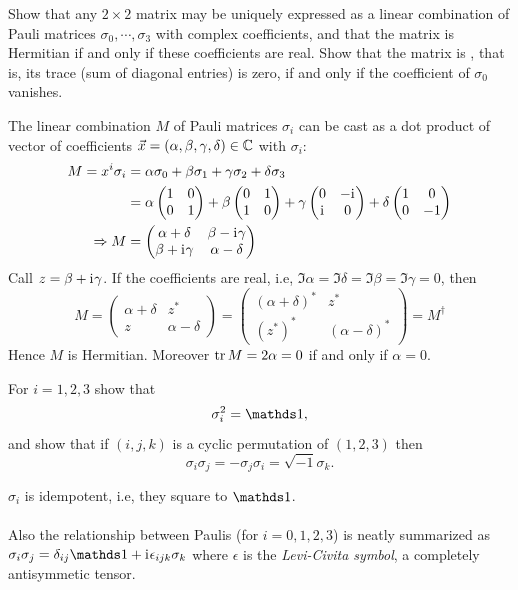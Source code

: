 \documentclass[10pt]{article}
\begin{document}
\begin{example}\label{b2e18}
	Show that any $2 \times 2$ matrix may be uniquely expressed as a linear combination of Pauli matrices $\sigma_0, \cdots, \sigma_3$ with complex coefficients, and that the matrix is Hermitian if and only if these coefficients are real. Show that the matrix is , that is, its trace (sum of diagonal entries) is zero, if and only if the coefficient of $\sigma_0$ vanishes.
\end{example}
\sol The linear combination $M$ of Pauli matrices $\sigma_i$ can be cast as a dot product of vector of coefficients $\vec{x} = (\alpha,\beta,\gamma,\delta) \in \mathbb{C}$ with $\sigma_i$:
$$
\begin{aligned}
	M = x^i\sigma_i &= \alpha\sigma_0 + \beta\sigma_1 + \gamma\sigma_2 + \delta\sigma_3\\
	&= \alpha\begin{pmatrix}
		1&0\\0&1
	\end{pmatrix}
	+ \beta\begin{pmatrix}
		0&1\\1&0
	\end{pmatrix}
	+ \gamma\begin{pmatrix}
		0&-\mathrm{i}\mkern1mu\\\mathrm{i}\mkern1mu&0
	\end{pmatrix}
	+ \delta\begin{pmatrix}
		1&0\\0&-1
	\end{pmatrix}\\
	\Rightarrow M &= \begin{pmatrix}
		\alpha+\delta&\beta-\mathrm{i}\mkern1mu\gamma\\\beta+\mathrm{i}\mkern1mu\gamma&\alpha-\delta
	\end{pmatrix}
\end{aligned}
$$
Call $z = \beta+\mathrm{i}\mkern1mu\gamma$. If the coefficients are real, i.e, $\Im\alpha = \Im\delta = \Im\beta = \Im\gamma = 0$, then
$$
M = \begin{pmatrix}
	\alpha+\delta&z^*\\z&\alpha-\delta
\end{pmatrix} = \begin{pmatrix}
	(\alpha+\delta)^*&z^*\\(z^*)^*&(\alpha-\delta)^*
\end{pmatrix} = M^\dag
$$
Hence $M$ is Hermitian. Moreover $\tr M = 2\alpha = 0$ if and only if $\alpha = 0$. 


\begin{example}\label{b2e19}
	For $i=1,2,3$ show that
	$$
	\sigma_i^2=\id,
	$$
	and show that if $(i,j,k)$ is a cyclic permutation of $(1,2,3)$ then
	$$
	\sigma_i\sigma_j=-\sigma_j\sigma_i=\sqrt{-1}\sigma_k.
	$$
\end{example}
\sol $\sigma_i$ is idempotent, i.e, they square to $\id$.\\\\
Also the relationship between Paulis (for $i=0,1,2,3$) is neatly summarized as $\sigma_i\sigma_j=\delta_{ij}\id +\di\epsilon_{ijk}\sigma_k$ where $\epsilon$ is the \emph{Levi-Civita symbol}, a completely antisymmetic tensor.
\end{document}
